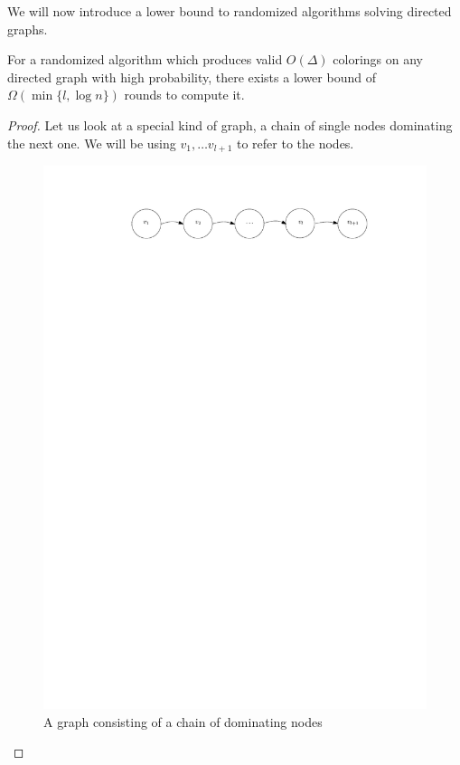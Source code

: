 We will now introduce a lower bound to randomized algorithms solving directed graphs.

\begin{theorem}\label{theorem:lowerbound}
For a randomized algorithm which produces valid $O(\Delta)$ colorings on any directed graph with high probability, there exists a lower bound of $\Omega (\min\{l, \log n\})$ rounds to compute it.

\end{theorem}
\begin{proof}
Let us look at a special kind of graph, a chain of single nodes dominating the next one. We will be using $v_1, \dots v_{l+1}$ to refer to the nodes.

\begin{figure}[ht]
\center
\includegraphics{figures/chain.pdf}
\caption{A graph consisting of a chain of dominating nodes}
\end{figure}


\end{proof}

